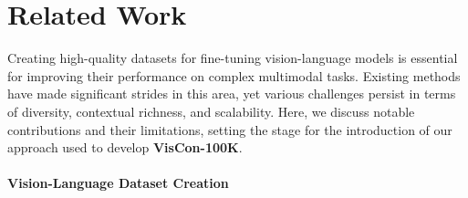 \section{Related Work}
Creating high-quality datasets for fine-tuning vision-language models is essential for improving their performance on complex multimodal tasks. Existing methods have made significant strides in this area, yet various challenges persist in terms of diversity, contextual richness, and scalability. Here, we discuss notable contributions and their limitations, setting the stage for the introduction of our approach used to develop \textbf{VisCon-100K}.

\paragraph{\textbf{Vision-Language Dataset Creation}}


